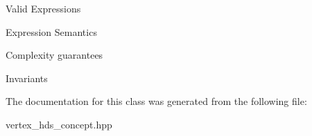 \begin{Desc}
\item[Valid Expressions]\end{Desc}
\begin{Desc}
\item[Expression Semantics]\end{Desc}
\begin{Desc}
\item[Complexity guarantees]\end{Desc}
\begin{Desc}
\item[Invariants ]\end{Desc}




The documentation for this class was generated from the following file:\begin{CompactItemize}
\item 
vertex\_\-hds\_\-concept.hpp\end{CompactItemize}

